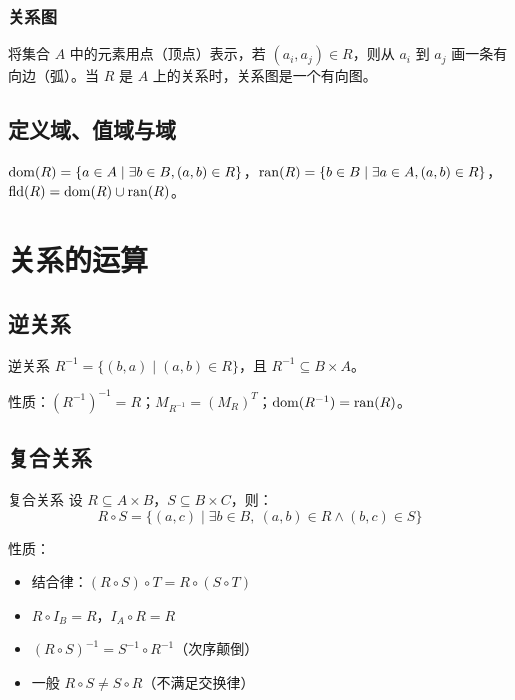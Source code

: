 \subsubsection{关系图}

将集合 $A$ 中的元素用点（顶点）表示，若 $(a_i,a_j) \in R$，则从 $a_i$ 到 $a_j$ 画一条有向边（弧）。当 $R$ 是 $A$ 上的关系时，关系图是一个有向图。

\subsection{定义域、值域与域}

$\operatorname{dom}(R) = \{a \in A \mid \exists b \in B, (a,b) \in R\}$，$\operatorname{ran}(R) = \{b \in B \mid \exists a \in A, (a,b) \in R\}$，$\mathrm{fld}(R) = \operatorname{dom}(R) \cup \operatorname{ran}(R)$。

\section{关系的运算}

\subsection{逆关系}

\begin{mydefinition}{逆关系}
$R^{-1} = \{(b,a) \mid (a,b) \in R\}$，且 $R^{-1} \subseteq B \times A$。
\end{mydefinition}

性质：$(R^{-1})^{-1} = R$；$M_{R^{-1}} = (M_R)^T$；$\operatorname{dom}(R^{-1}) = \operatorname{ran}(R)$。

\subsection{复合关系}

\begin{mydefinition}{复合关系}
设 $R \subseteq A \times B$，$S \subseteq B \times C$，则：
\[R \circ S = \{(a,c) \mid \exists b \in B,\ (a,b) \in R \land (b,c) \in S\}\]
\end{mydefinition}

性质：
\begin{itemize}
\item 结合律：$(R \circ S) \circ T = R \circ (S \circ T)$
\item $R \circ I_B = R$，$I_A \circ R = R$
\item $(R \circ S)^{-1} = S^{-1} \circ R^{-1}$（次序颠倒）
\item 一般 $R \circ S \neq S \circ R$（不满足交换律）
\end{itemize}

